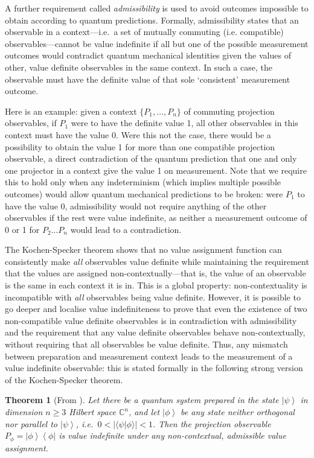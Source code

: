 \documentclass[%
 superscriptaddress,
 preprint,
 showpacs,
 showkeys,
 preprintnumbers,
  amsmath,amssymb,
  aps,
 pra,
  longbibliography,
  floatfix,
 ]{revtex4-1}
\newtheorem{theorem}{Theorem}
\theoremstyle{definition}
\newcommand{\C}{\mathbb{C}}%
\newcommand{\bra}[1]{\left< #1 \right|}
\newcommand{\ket}[1]{\left| #1 \right>}
\newcommand{\iprod}[2]{\langle #1 | #2 \rangle}
\begin{document}
 A further requirement called \emph{admissibility} is used to avoid outcomes  impossible to obtain according to quantum predictions.
Formally, admissibility states that an observable in a context---i.e.\ a set of mutually commuting (i.e. compatible) observables---cannot be value indefinite if all but one of the possible measurement outcomes would contradict quantum mechanical identities given the values of other, value definite observables in the same context.
In such a case, the observable must have the definite value of that sole `consistent' measurement outcome.

Here is an example: given a context $\{P_1,\dots,P_n\}$ of commuting projection observables, if $P_1$ were to have the definite value 1, all other observables in this context must have the value 0.
Were this not the case, there would be a possibility to obtain the value 1 for more than one compatible projection observable, a direct contradiction of the quantum prediction that one and only one projector in a context give the value 1 on measurement.
Note that we require this to hold only when any indeterminism (which implies multiple possible outcomes) would allow quantum mechanical predictions to be broken:
were $P_1$ to have the value 0, admissibility would not require anything of the other observables if the rest were value indefinite, as neither a measurement outcome of 0 or 1 for $P_2\dots P_n$ would lead to a contradiction.

The Kochen-Specker theorem \cite{kochen1} shows that no value assignment function can consistently make \emph{all} observables value definite while maintaining the requirement that the values are assigned non-contextually---that is, the value of an observable is the same in each context it is in.
This is a global property: non-contextuality is incompatible with \emph{all} observables being value definite.
However, it is possible to go deeper and localise value indefiniteness to prove that even the existence of two non-compatible value definite observables is in contradiction with admissibility and the requirement that any value definite observables behave non-contextually, without requiring that all observables be value definite.
Thus, any mismatch between preparation and measurement context leads to the measurement of a value indefinite observable: this is stated formally in the following strong version of the Kochen-Specker theorem.

\begin{theorem}[From \cite{2012-incomput-proofsCJ,PhysRevA.89.032109}]
	\label{thm:vi-everywhere}
		Let there be a quantum system prepared in the state
	$\ket{\psi}$ in dimension $n\ge 3$ Hilbert space $\C^n$, and let $\ket{\phi}$ be any state neither orthogonal nor parallel to $\ket{\psi}$, i.e.\ $0<|\iprod{\psi}{\phi}|<1$.
	Then the projection observable $P_\phi=\ket{\phi}\bra{\phi}$ is value indefinite under any non-contextual, admissible value assignment.
\end{theorem}
\end{document}
